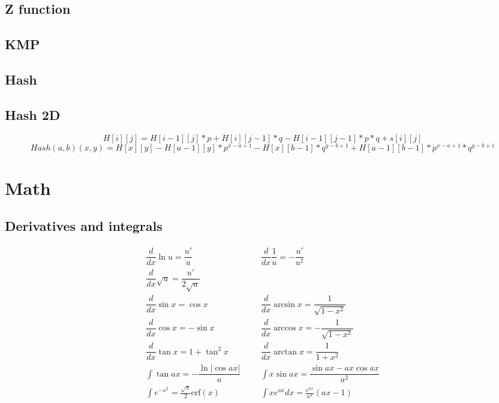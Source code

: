 \documentclass[A4 paper, 12pt, oneside]{article}
\begin{document}
\begin{landscape}
\begin{multicols}{2}
	\subsection{Z function}
	
	
	\subsection{KMP}
	
	
	\subsection{Hash}
	
	
	\subsection{Hash 2D}
	\begin{dmath}
	H[i][j] = H[i - 1][j] * p + H[i][j - 1] * q - H[i - 1][j - 1] * p * q + s[i][j]
	\end{dmath}
	\begin{dmath}
	Hash(a,b)(x,y) = H[x][y] - H[a - 1][y]*p^{x - a + 1} - H[x][b - 1]*q^{y - b + 1} + H[a - 1][b - 1] * p^{x - a + 1} * q^{y - b + 1}
	\end{dmath}

\section{Math}	
	\subsection{Derivatives and integrals}
	\begin{align*}
        \dfrac{d}{dx}\ln{u} = \dfrac{u'}{u} &&& \dfrac{d}{dx}\dfrac{1}{u} = -\dfrac{u'}{u^2} \\
    	\dfrac{d}{dx}\sqrt u = \dfrac{u'}{2\sqrt u} \\
    	\dfrac{d}{dx}\sin x = \cos x &&& \dfrac{d}{dx}\arcsin x = \dfrac{1}{\sqrt{1-x^2}} \\ 
    	\dfrac{d}{dx}\cos x = -\sin x &&& \dfrac{d}{dx}\arccos x = -\dfrac{1}{\sqrt{1-x^2}} \\
    	\dfrac{d}{dx}\tan x = 1+\tan^2 x &&& \dfrac{d}{dx}\arctan x = \dfrac{1}{1+x^2} \\
    	\int\tan ax = -\dfrac{\ln|\cos ax|}{a} &&& \int x\sin ax = \dfrac{\sin ax-ax \cos ax}{a^2} \\
    	\int e^{-x^2} = \frac{\sqrt \pi}{2} \text{erf}(x) &&& \int xe^{ax}dx = \frac{e^{ax}}{a^2}(ax-1)
	\end{align*}


\end{multicols}
\end{landscape}
\end{document}
